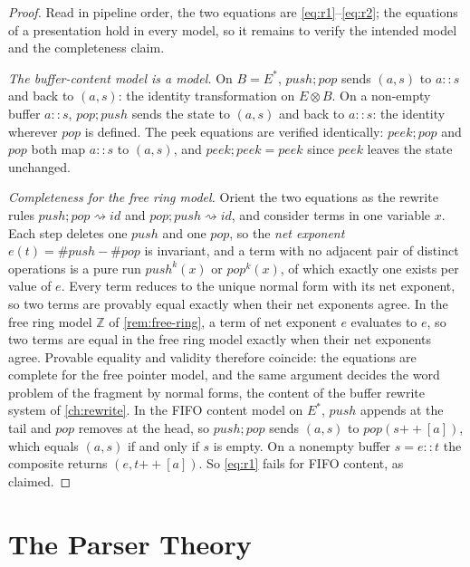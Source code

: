 \begin{proof}
Read in pipeline order, the two equations are \eqref{eq:r1}--\eqref{eq:r2};
the equations of a presentation hold in every model, so it remains to
verify the intended model and the completeness claim.

\emph{The buffer-content model is a model.} On $B = E^{*}$,
$\mathit{push};\mathit{pop}$ sends $(a,s)$ to $a \mathbin{::} s$ and back
to $(a,s)$: the identity transformation on $E \otimes B$. On a non-empty
buffer $a \mathbin{::} s$, $\mathit{pop};\mathit{push}$ sends the state to
$(a,s)$ and back to $a \mathbin{::} s$: the identity wherever $\mathit{pop}$
is defined. The peek equations are verified identically:
$\mathit{peek};\mathit{pop}$ and $\mathit{pop}$ both map $a \mathbin{::} s$
to $(a,s)$, and $\mathit{peek};\mathit{peek} = \mathit{peek}$ since
$\mathit{peek}$ leaves the state unchanged.

\emph{Completeness for the free ring model.} Orient the two equations as
the rewrite rules $\mathit{push};\mathit{pop} \rightsquigarrow \mathit{id}$
and $\mathit{pop};\mathit{push} \rightsquigarrow \mathit{id}$, and consider
terms in one variable $x$. Each step deletes one $\mathit{push}$ and one
$\mathit{pop}$, so the \emph{net exponent} $e (t) = \#\mathit{push} -
\#\mathit{pop}$ is invariant, and a term with no adjacent pair of distinct
operations is a pure run $\mathit{push}^{k} (x)$ or $\mathit{pop}^{k} (x)$,
of which exactly one exists per value of $e$. Every term reduces to the
unique normal form with its net exponent, so two terms are provably equal
exactly when their net exponents agree. In the free ring model
$\mathbb{Z}$ of \autoref{rem:free-ring}, a term of net exponent $e$
evaluates to $e$, so two terms are equal in the free ring model exactly
when their net exponents agree. Provable equality and validity therefore
coincide: the equations are complete for the free pointer model, and the same
argument decides the word problem of the fragment by normal forms, the
content of the buffer rewrite system of \autoref{ch:rewrite}. In the FIFO
content model on $E^{*}$, $\mathit{push}$ appends at the tail and
$\mathit{pop}$ removes at the head, so
$\mathit{push};\mathit{pop}$ sends $(a, s)$ to
$\mathit{pop} (s \mathbin{+\!\!+} [a])$, which equals $(a, s)$ if and
only if $s$ is empty. On a nonempty buffer $s = e \mathbin{::} t$ the
composite returns $(e, t \mathbin{+\!\!+} [a])$. So \eqref{eq:r1} fails
for FIFO content, as claimed.
\end{proof}

\section{The Parser Theory}\label{sec:lawvere-parser}

